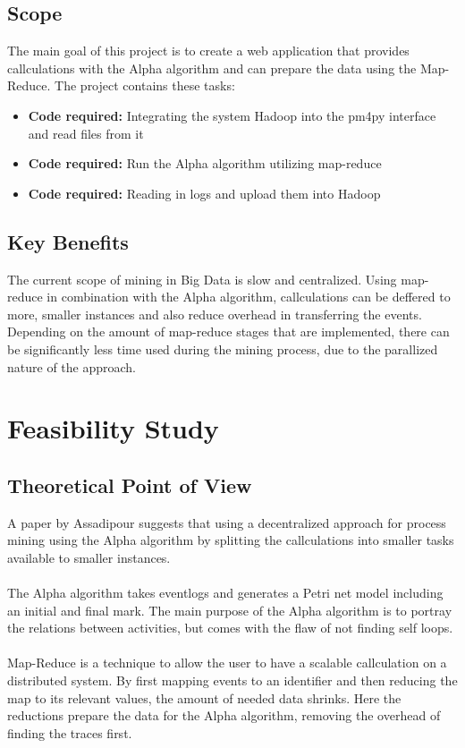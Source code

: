 \documentclass[runningheads]{llncs}
\begin{document}
\subsection{Scope}
The main goal of this project is to create a web application that provides callculations with the Alpha algorithm and can prepare the data using the Map-Reduce. The project contains these tasks:\\
\begin{itemize}
	\item[\cdot] \textbf{Code required:} Integrating the system Hadoop into the pm4py interface and read files from it
	\item[\cdot] \textbf{Code required:} Run the Alpha algorithm utilizing map-reduce 
	\item[\cdot] \textbf{Code required:} Reading in logs and upload them into Hadoop
\end{itemize}

\subsection{Key Benefits}
The current scope of mining in Big Data is slow and centralized. Using map-reduce in combination with the Alpha algorithm, callculations can be deffered to more, smaller instances and also reduce overhead in transferring the events. Depending on the amount of  map-reduce stages that are implemented, there can be significantly less time used during the mining process, due to the parallized nature of the approach. \cite{mapReduce}
\section{Feasibility Study}

\subsection{Theoretical Point of View}
A paper by Assadipour\cite{mapReduce} suggests that using a decentralized approach for process mining using the Alpha algorithm by splitting the callculations into smaller tasks available to smaller instances. \\ \ \\
The Alpha algorithm takes eventlogs and generates a Petri net model including an initial and final mark. The main purpose of the Alpha algorithm is to portray the relations between activities, but comes with the flaw of not finding self loops.  \\ \ \\
Map-Reduce is a technique to allow the user to have a scalable callculation on a distributed system. By first mapping events to an identifier and then reducing the map to its relevant values, the amount of needed data shrinks. Here the reductions prepare the data for the Alpha algorithm, removing the overhead of finding the traces first.
\end{document}
